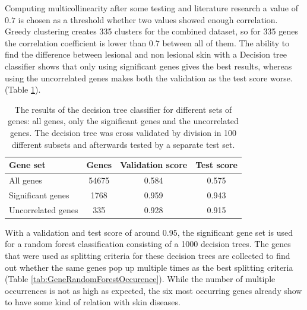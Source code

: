 \documentclass[10pt,a4paper]{article}
\begin{document}
	
	Computing multicollinearity after some testing and literature research a value of $0.7$ is chosen as a threshold whether two values showed enough correlation. Greedy clustering creates 335 clusters for the combined dataset, so for 335 genes the correlation coefficient is lower than $0.7$ between all of them. The ability to find the difference between lesional and non lesional skin with a Decision tree classifier shows that only using significant genes gives the best results, whereas using the uncorrelated genes makes both the validation as the test score worse. (Table \ref{tab:DecisionTreeResults}).
	
	\begin{table}[H]
		\centering
		\caption{The results of the decision tree classifier for different sets of genes: all genes, only the significant genes and the uncorrelated genes. The decision tree was cross validated by division in 100 different subsets and afterwards tested by a separate test set.}
		\label{tab:DecisionTreeResults}
		\begin{tabular}{l|ccc}
			\textbf{Gene set}                                            & \textbf{Genes} & \textbf{Validation score} & \textbf{Test score} \\ \hline
			All genes                                                    & 54675             & 0.584                     & 0.575               \\
			Significant genes                                            & 1768              & 0.959                     & 0.943               \\
			Uncorrelated genes & 335               & 0.928                     & 0.915              
		\end{tabular}
	\end{table}
	
	With a validation and test score of around 0.95, the significant gene set is used for a random forest classification consisting of a 1000 decision trees. The genes that were used as splitting criteria for these decision trees are collected to find out whether the same genes pop up multiple times as the best splitting criteria (Table \ref{tab:GeneRandomForestOccurence}). While the number of multiple occurrences is not as high as expected, the six most occurring genes already show to have some kind of relation with skin diseases. 
	
\end{document}
